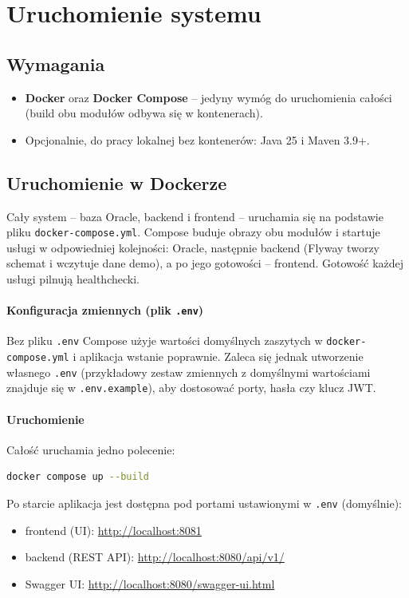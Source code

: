 \documentclass[12pt,a4paper]{article}
\begin{document}
\section{Uruchomienie systemu}
\label{sec:uruchomienie}

\subsection{Wymagania}
\begin{itemize}[leftmargin=*]
  \item \textbf{Docker} oraz \textbf{Docker Compose} -- jedyny wymóg do
        uruchomienia całości (build obu modułów odbywa się w kontenerach).
  \item Opcjonalnie, do pracy lokalnej bez kontenerów: Java 25 i Maven 3.9+.
\end{itemize}

\subsection{Uruchomienie w Dockerze}
Cały system -- baza Oracle, backend i frontend -- uruchamia się na podstawie
pliku \texttt{docker-compose.yml}. Compose buduje obrazy obu modułów i startuje
usługi w odpowiedniej kolejności: Oracle, następnie backend (Flyway tworzy
schemat i wczytuje dane demo), a po jego gotowości -- frontend. Gotowość każdej
usługi pilnują healthchecki.


\paragraph{Konfiguracja zmiennych (plik \texttt{.env})} Bez pliku \texttt{.env} Compose użyje
wartości domyślnych zaszytych w \texttt{docker-compose.yml} i aplikacja wstanie
poprawnie. Zaleca się jednak utworzenie własnego \texttt{.env} (przykładowy zestaw
zmiennych z domyślnymi wartościami znajduje się w \texttt{.env.example}), aby
dostosować porty, hasła czy klucz JWT.

\paragraph{Uruchomienie} Całość uruchamia jedno polecenie:
\begin{lstlisting}[language=bash, numbers=none]
docker compose up --build
\end{lstlisting}
Po starcie aplikacja jest dostępna pod portami ustawionymi w \texttt{.env}
(domyślnie):
\begin{itemize}[leftmargin=*]
  \item frontend (UI): \url{http://localhost:8081}
  \item backend (REST API): \url{http://localhost:8080/api/v1/}
  \item Swagger UI: \url{http://localhost:8080/swagger-ui.html}
\end{itemize}
\end{document}
